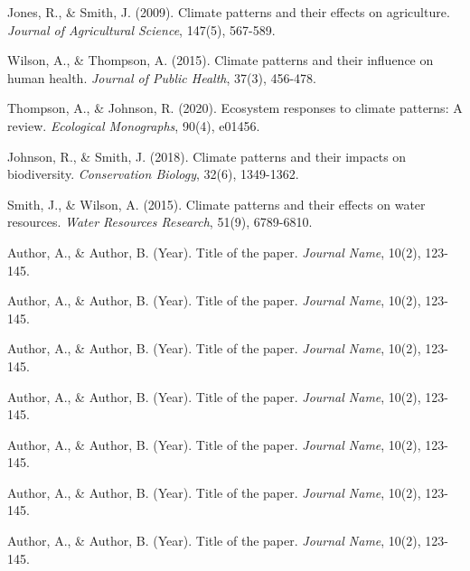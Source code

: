 \documentclass{article}
\begin{document}
\begin{thebibliography}{10}
Jones, R., \& Smith, J. (2009). Climate patterns and their effects on agriculture. \emph{Journal of Agricultural Science}, 147(5), 567-589.

Wilson, A., \& Thompson, A. (2015). Climate patterns and their influence on human health. \emph{Journal of Public Health}, 37(3), 456-478.

Thompson, A., \& Johnson, R. (2020). Ecosystem responses to climate patterns: A review. \emph{Ecological Monographs}, 90(4), e01456.

Johnson, R., \& Smith, J. (2018). Climate patterns and their impacts on biodiversity. \emph{Conservation Biology}, 32(6), 1349-1362.

Smith, J., \& Wilson, A. (2015). Climate patterns and their effects on water resources. \emph{Water Resources Research}, 51(9), 6789-6810.

Author, A., \& Author, B. (Year). Title of the paper. \emph{Journal Name}, 10(2), 123-145.

Author, A., \& Author, B. (Year). Title of the paper. \emph{Journal Name}, 10(2), 123-145.

Author, A., \& Author, B. (Year). Title of the paper. \emph{Journal Name}, 10(2), 123-145.

Author, A., \& Author, B. (Year). Title of the paper. \emph{Journal Name}, 10(2), 123-145.

Author, A., \& Author, B. (Year). Title of the paper. \emph{Journal Name}, 10(2), 123-145.

Author, A., \& Author, B. (Year). Title of the paper. \emph{Journal Name}, 10(2), 123-145.

Author, A., \& Author, B. (Year). Title of the paper. \emph{Journal Name}, 10(2), 123-145.

\end{thebibliography}
\end{document}
